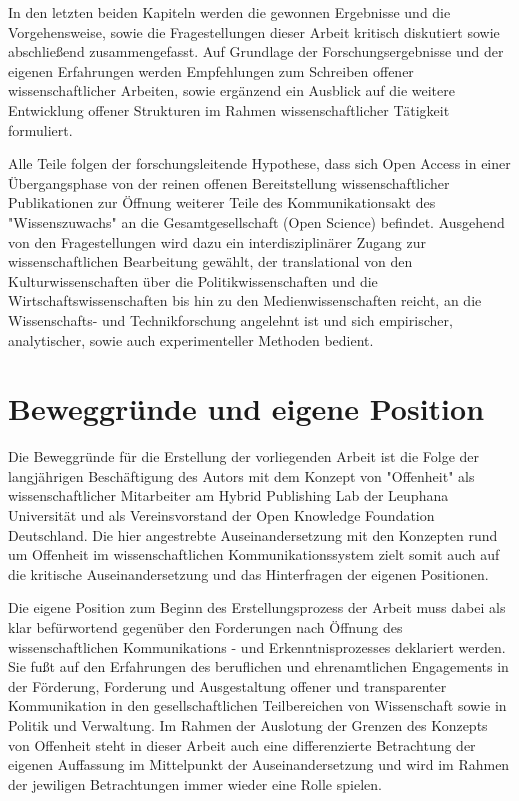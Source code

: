 In den letzten beiden Kapiteln werden die gewonnen Ergebnisse und die Vorgehensweise, sowie die Fragestellungen dieser Arbeit kritisch diskutiert sowie abschließend zusammengefasst. Auf Grundlage der Forschungsergebnisse und der eigenen Erfahrungen werden Empfehlungen zum Schreiben offener wissenschaftlicher Arbeiten, sowie ergänzend ein Ausblick auf die weitere Entwicklung offener Strukturen im Rahmen wissenschaftlicher Tätigkeit formuliert.

Alle Teile folgen der forschungsleitende Hypothese, dass sich Open Access in einer Übergangsphase von der reinen offenen Bereitstellung wissenschaftlicher Publikationen zur Öffnung weiterer Teile des Kommunikationsakt des "Wissenszuwachs" \cite{Luhmann1998} an die Gesamtgesellschaft (Open Science) befindet. Ausgehend von den Fragestellungen wird dazu ein interdisziplinärer Zugang zur wissenschaftlichen Bearbeitung gewählt, der translational von den Kulturwissenschaften über die Politikwissenschaften und die Wirtschaftswissenschaften bis hin zu den Medienwissenschaften reicht, an die Wissenschafts- und Technikforschung angelehnt ist und sich empirischer, analytischer, sowie auch experimenteller Methoden bedient.

\section{Beweggründe und eigene Position}

Die Beweggründe für die Erstellung der vorliegenden Arbeit ist die Folge der langjährigen Beschäftigung des Autors mit dem Konzept von "Offenheit" als wissenschaftlicher Mitarbeiter am Hybrid Publishing Lab der Leuphana Universität und als Vereinsvorstand der Open Knowledge Foundation Deutschland. Die hier angestrebte Auseinandersetzung mit den Konzepten rund um Offenheit im wissenschaftlichen Kommunikationssystem zielt somit auch auf die kritische Auseinandersetzung und das Hinterfragen der eigenen Positionen.

Die eigene Position zum Beginn des Erstellungsprozess der Arbeit muss dabei als klar befürwortend gegenüber den Forderungen nach Öffnung des wissenschaftlichen Kommunikations - und Erkenntnisprozesses deklariert werden. Sie fußt auf den Erfahrungen des beruflichen und ehrenamtlichen Engagements in der Förderung, Forderung und Ausgestaltung offener und transparenter Kommunikation in den gesellschaftlichen Teilbereichen von Wissenschaft sowie in Politik und Verwaltung. Im Rahmen der Auslotung der Grenzen des Konzepts von Offenheit steht in dieser Arbeit auch eine differenzierte Betrachtung der eigenen Auffassung im Mittelpunkt der Auseinandersetzung und wird im Rahmen der jewiligen Betrachtungen immer wieder eine Rolle spielen.

